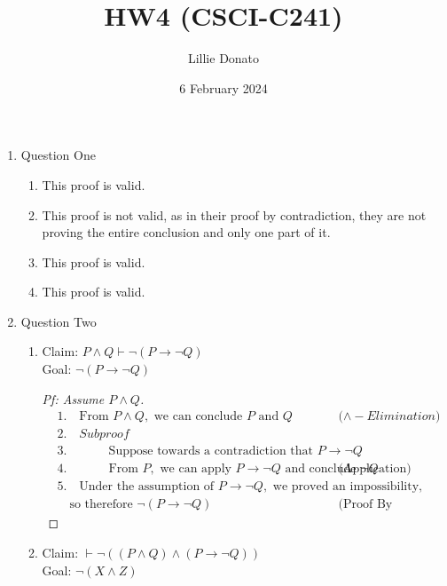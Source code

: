 \documentclass{article}
\title{HW4 (CSCI-C241)}
\author{Lillie Donato}
\date{6 February 2024}
\begin{document}
\maketitle

\begin{enumerate}
    \item Question One
    \begin{enumerate}
        \item This proof is valid.
        \item This proof is not valid, as in their proof by contradiction, they are not proving the entire conclusion and only one part of it.
        \item This proof is valid.
        \item This proof is valid.
    \end{enumerate}
    \item Question Two
    \begin{enumerate}
        \item
        Claim: $P \land Q \vdash \neg (P \rightarrow \neg Q)$ \\
        Goal: $\neg (P \rightarrow \neg Q)$
        \begin{proof}[Pf: Assume $P \land Q$]
            \begin{align*}
                &1. \quad \text{From } P \land Q, \text{ we can conclude } P \text{ and } Q && \text{($\land - Elimination$)} \\
                &2. \quad Subproof \\
                &3. \quad \hspace{1cm} \text{Suppose towards a contradiction that } P \rightarrow \neg Q \\
                &4. \quad \hspace{1cm} \text{From } P, \text{ we can apply } P \rightarrow \neg Q \text{ and conclude } \neg Q && \text{(Application)} \\
                &5. \quad \text{Under the assumption of } P \rightarrow \neg Q, \text{ we proved an impossibility, } \\
                &\quad \text{so therefore } \neg(P \rightarrow \neg Q) && \text{(Proof By Contradiction)}
            \end{align*}
        \end{proof}
        \item
        Claim: $\vdash \neg ((P \land Q) \land (P \rightarrow \neg Q))$ \\
        Goal: $\neg (X \land Z)$

\end{enumerate}
\end{enumerate}
\end{document}
